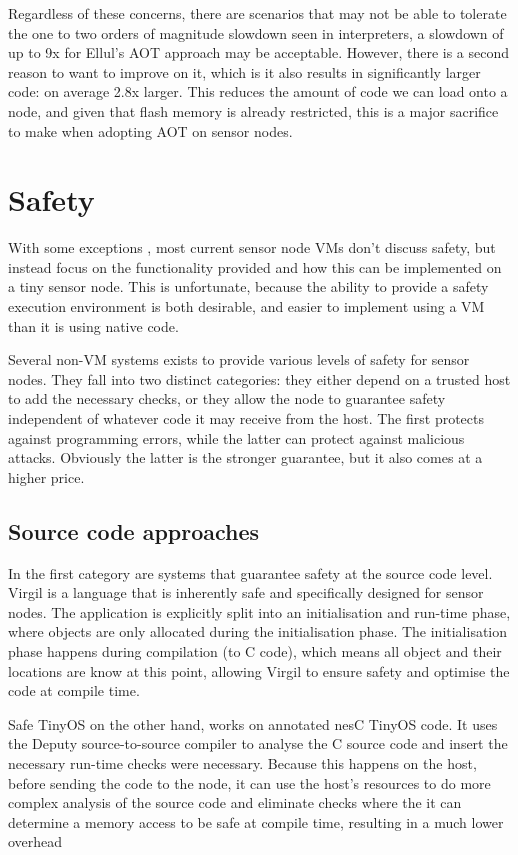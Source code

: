 Regardless of these concerns, there are scenarios that may not be able to tolerate the one to two orders of magnitude slowdown seen in interpreters, a slowdown of up to 9x for Ellul's AOT approach may be acceptable. However, there is a second reason to want to improve on it, which is it also results in significantly larger code: on average 2.8x larger. This reduces the amount of code we can load onto a node, and given that flash memory is already restricted, this is a major sacrifice to make when adopting AOT on sensor nodes.


\section{Safety}
\label{sec-state-of-the-art-safety}
With some exceptions \cite{Evers:2010ur}, most current sensor node VMs don't discuss safety, but instead focus on the functionality provided and how this can be implemented on a tiny sensor node. This is unfortunate, because the ability to provide a safety execution environment is both desirable, and easier to implement using a VM than it is using native code.

Several non-VM systems exists to provide various levels of safety for sensor nodes. They fall into two distinct categories: they either depend on a trusted host to add the necessary checks, or they allow the node to guarantee safety independent of whatever code it may receive from the host. The first protects against programming errors, while the latter can protect against malicious attacks. Obviously the latter is the stronger guarantee, but it also comes at a higher price.

\subsection{Source code approaches}
In the first category are systems that guarantee safety at the source code level. Virgil \cite{Titzer:2006uy} is a language that is inherently safe and specifically designed for sensor nodes. The application is explicitly split into an initialisation and run-time phase, where objects are only allocated during the initialisation phase. The initialisation phase happens during compilation (to C code), which means all object and their locations are know at this point, allowing Virgil to ensure safety and optimise the code at compile time.

Safe TinyOS on the other hand, works on annotated nesC TinyOS code. It uses the Deputy \cite{Condit:2007uo} source-to-source compiler to analyse the C source code and insert the necessary run-time checks were necessary. Because this happens on the host, before sending the code to the node, it can use the host's resources to do more complex analysis of the source code and eliminate checks where the it can determine a memory access to be safe at compile time, resulting in a much lower overhead


